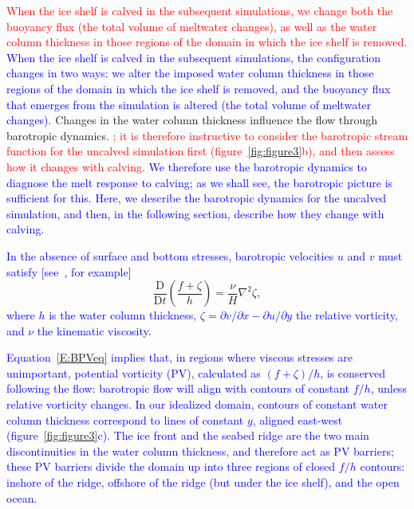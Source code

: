 \documentclass[draft]{agujournal2019}
\newcommand{\red}[1]{\textcolor{red}{#1}}
\newcommand{\blue}[1]{\textcolor{blue}{#1}}
\begin{document}
\red{When the ice shelf is calved in the subsequent simulations, we change both the buoyancy flux (the total volume of meltwater changes), as well as the water column thickness in those regions of the domain in which the ice shelf is removed.}
\blue{When the ice shelf is calved in the subsequent simulations, the configuration changes in two ways: we alter the imposed water column thickness in those regions of the domain in which the ice shelf is removed, and the buoyancy flux that emerges from the simulation is altered (the total volume of meltwater changes).}
 Changes in the water column thickness influence the flow through barotropic dynamics. \red{; it is therefore instructive to consider  the barotropic stream function for the uncalved simulation first (figure~\ref{fig:figure3}b), and then assess how it changes with calving.}  \blue{We therefore use the barotropic dynamics to diagnose the melt response to calving; as we shall see, the barotropic picture is sufficient for this. Here, we describe the barotropic dynamics for the uncalved simulation, and then, in the following section, describe how they change with calving.}

\blue{In the absence of surface and bottom stresses, barotropic velocities $u$ and $v$ must satisfy [see~\citeA{Patmore2019JPO}, for example]}
 \begin{equation}\label{E:BPVeq}
\frac{\mathrm{D}}{\mathrm{D}t}\left( \frac{f + \zeta}{h}\right) = \frac{\nu}{H}\nabla^2 \zeta,
 \end{equation}
 \blue{
where $h$ is the water column thickness, $\zeta = \partial v / \partial x - \partial u / \partial y$ the relative vorticity,  and $\nu$ the kinematic viscosity. }

\blue{Equation~\eqref{E:BPVeq} implies that, in regions where viscous stresses are unimportant, potential vorticity (PV),  calculated as $(f + \zeta)/h$, is conserved following the flow: barotropic flow will align with contours of constant $f/h$, unless relative vorticity changes. In our idealized domain, contours of constant water column thickness correspond to lines of constant $y$, aligned east-west (figure~\ref{fig:figure3}c). The ice front and the seabed ridge are the two main discontinuities in the water column thickness, and therefore act as PV barriers; these PV barriers divide the domain up into three regions of closed $f/h$ contours: inshore of the ridge, offshore of the ridge (but under the ice shelf), and the open ocean.}
\end{document}
